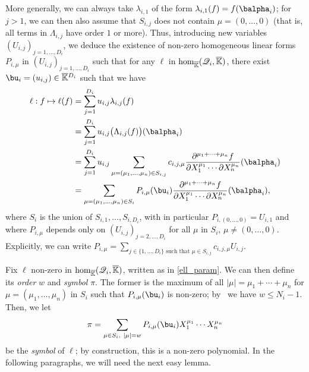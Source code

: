 \documentclass[12pt]{article}
\newcommand{\residueI}{\mathscr{Q}}
\def\Kbar {{\ensuremath{\overline{\mathbb{K}}}}}
\begin{document}
More generally, we can always take $\lambda_{i,1}$ of the form
$\lambda_{i,1}(f) = f(\balpha_i)$; for $j>1$, we can then also assume
that $S_{i,j}$ does not contain $\mu=(0,\dots,0)$ (that is, all terms
in $\Lambda_{i,j}$ have order $1$ or more). Thus, introducing new
variables $(U_{i,j})_{j =1,\dots,D_i}$, we deduce the existence of
non-zero homogeneous linear forms $P_{i,\mu}$ in
$(U_{i,j})_{j=1,\dots,D_i}$ such that for any $\ell$ in ${\rm
	hom}_\Kbar(\residueI_i,\Kbar)$, there exist $\bu_i=(u_{i,j}) \in
\Kbar{}^{D_i}$ such that we have
\begin{align}\label{ell_param}
\ell: f \mapsto \ell(f)
&= \sum_{j=1}^{D_i} u_{i,j} \lambda_{i,j}(f)\nonumber\\
&= \sum_{j=1}^{D_i} u_{i,j} \big(\Lambda_{i,j}(f)\big)(\balpha_i)\nonumber\\
&= \sum_{j=1}^{D_i} u_{i,j}
\sum_{\mu=(\mu_1,\dots,\mu_n) \in
	S_{i,j}} c_{i,j,\mu} \frac{ \partial^{\mu_1 + \cdots + \mu_n} f}
{\partial X_1^{\mu_1} \cdots \partial X_n^{\mu_n}}(\balpha_i)\nonumber\\
&= \sum_{\mu=(\mu_1,\dots,\mu_n) \in S_i} P_{i,\mu}(\bu_i)
\frac{ \partial^{\mu_1 + \cdots + \mu_n} f}
{\partial X_1^{\mu_1} \cdots \partial X_n^{\mu_n}}(\balpha_i),
\end{align}
where $S_i$ is  the union of $S_{i,1},\dots,S_{i,D_i}$,
with in particular $P_{i,(0,\dots,0)}=U_{i,1}$ and where $P_{i,\mu}$
depends only on $(U_{i,j})_{j =2,\dots,D_i}$ for all $\mu$ in $S_i$,
$\mu \ne (0,\dots,0)$. Explicitly, we can write $P_{i,\mu}=\sum_{j\in
	\{1,\dots,D_i\} \text{~such that~} \mu \in S_{i,j}} c_{i,j,\mu}
U_{i,j}$. 

Fix $\ell$ non-zero in ${\rm hom}_\Kbar(\residueI_i,\Kbar)$, written
as in \cref{ell_param}. We can then
define its {\em order} $w$ and {\em symbol} $\pi$. The former is
the maximum of all $|\mu|=\mu_1+\cdots+\mu_n$ for
$\mu=(\mu_1,\dots,\mu_n)$ in $S_i$ such that $P_{i,\mu}(\bu_i)$ is
non-zero; by~\cite[Lemma~3.3]{Mourrain97} we have $w \le
N_i-1$. Then, we let
$$\pi =\sum_{\mu \in S_i,\ |\mu|=w}P_{i,\mu}(\bu_i) X_1^{\mu_1} \cdots
X_n^{\mu_n}$$ be the {\em symbol} of $\ell$; by construction,
this is a non-zero polynomial. In the following paragraphs, we will
need the next easy lemma.
\end{document}
